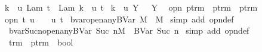 \begin{isabellebody}
{\isachardoublequoteopen}{\isacharbraceleft}k\ {\isasymrightarrow}\ u{\isacharbraceright}\ {\isacharparenleft}Lam\ t{\isacharparenright}\ {\isacharequal}\ Lam\ {\isacharparenleft}{\isacharbraceleft}{\isacharparenleft}k{\isacharplus}{}{\isacharparenright}\ {\isasymrightarrow}\ u{\isacharbraceright}\ t{\isacharparenright}{\isachardoublequoteclose}\ {\isacharbar}\isanewline
{\isachardoublequoteopen}{\isacharbraceleft}k\ {\isasymrightarrow}\ u{\isacharbraceright}\ {\isacharparenleft}Y\ {\isasymsigma}{\isacharparenright}\ {\isacharequal}\ Y\ {\isasymsigma}{\isachardoublequoteclose}\isanewline
\isanewline
{}\isamarkupfalse%
\ opn{\isacharprime}{\isacharcolon}{\isacharcolon}\ {\isachardoublequoteopen}ptrm\ {\isasymRightarrow}\ ptrm\ {\isasymRightarrow}\ ptrm{\isachardoublequoteclose}\ {\isacharparenleft}{\isachardoublequoteopen}{\isacharunderscore}{\isacharcircum}{\isacharunderscore}{\isachardoublequoteclose}{\isacharparenright}\ \isanewline
{\isachardoublequoteopen}opn{\isacharprime}\ t\ u\ {\isasymequiv}\ {\isacharbraceleft}{}\ {\isasymrightarrow}\ u{\isacharbraceright}\ t{\isachardoublequoteclose}\isanewline
\isanewline
{}\isamarkupfalse%
\ bvar{\isacharunderscore}{}{\isacharunderscore}open{\isacharunderscore}any{\isacharcolon}{\isachardoublequoteopen}BVar\ {}{\isacharcircum}M\ {\isacharequal}\ M{\isachardoublequoteclose}\isanewline
%
\isadelimproof
%
\endisadelimproof
%
\isatagproof
{}\isamarkupfalse%
\ {\isacharparenleft}simp\ add{\isacharcolon}\ opn{\isacharprime}{\isacharunderscore}def{\isacharparenright}%
\endisatagproof
{\isafoldproof}%
%
\isadelimproof
\isanewline
%
\endisadelimproof
\isanewline
{}\isamarkupfalse%
\ bvar{\isacharunderscore}Suc{\isacharunderscore}n{\isacharunderscore}open{\isacharunderscore}any{\isacharcolon}{\isachardoublequoteopen}{\isacharparenleft}BVar\ {\isacharparenleft}Suc\ n{\isacharparenright}{\isacharparenright}{\isacharcircum}M\ {\isacharequal}\ BVar\ {\isacharparenleft}Suc\ n{\isacharparenright}{\isachardoublequoteclose}\isanewline
%
\isadelimproof
%
\endisadelimproof
%
\isatagproof
{}\isamarkupfalse%
\ {\isacharparenleft}simp\ add{\isacharcolon}\ opn{\isacharprime}{\isacharunderscore}def{\isacharparenright}%
\endisatagproof
{\isafoldproof}%
%
\isadelimproof
%
\endisadelimproof
%
\isamarkuptrue%
\isamarkupfalse%
\ trm\ {\isacharcolon}{\isacharcolon}\ {\isachardoublequoteopen}ptrm\ {\isasymRightarrow}\ bool{\isachardoublequoteclose}\ \isanewline

\end{isabellebody}
